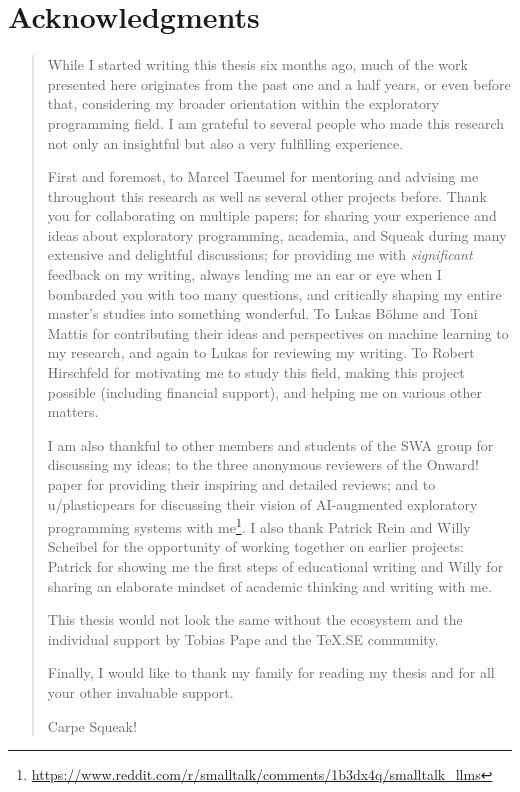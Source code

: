 
\begingroup
\let\raggedsection\centering

\chapter*{Acknowledgments}
\label{cha:acknowledgments}
\endgroup
\begin{quotation}
	\noindent
	\begin{footnotesize}
	While I started writing this thesis six months ago, much of the work presented here originates from the past one and a half years, or even before that, considering my broader orientation within the exploratory programming field.
	I am grateful to several people who made this research not only an insightful but also a very fulfilling experience.

	First and foremost, to Marcel Taeumel for mentoring and advising me throughout this research as well as several other projects before. Thank you for collaborating on multiple papers; for sharing your experience and ideas about exploratory programming, academia, and Squeak during many extensive and delightful discussions; for providing me with \emph{significant} feedback on my writing, always lending me an ear or eye when I bombarded you with too many questions, and critically shaping my entire master's studies into something wonderful.
	To Lukas Böhme and Toni Mattis for contributing their ideas and perspectives on machine learning to my research, and again to Lukas for reviewing my writing.
	To Robert Hirschfeld for motivating me to study this field, making this project possible (including financial support), and helping me on various other matters.

	I am also thankful to other members and students of the SWA group for discussing my ideas; to the three anonymous reviewers of the Onward! paper for providing their inspiring and detailed reviews; and to u/plasticpears for discussing their vision of AI-augmented exploratory programming systems with me\footnote{\url{https://www.reddit.com/r/smalltalk/comments/1b3dx4q/smalltalk_llms}}.
	I also thank Patrick Rein and Willy Scheibel for the opportunity of working together on earlier projects: Patrick for showing me the first steps of educational writing and Willy for sharing an elaborate mindset of academic thinking and writing with me.

	This thesis would not look the same without the ecosystem and the individual support by Tobias Pape and the \TeX.SE community.

	Finally, I would like to thank my family for reading my thesis and for all your other invaluable support.

	\medskip

	Carpe Squeak!
	\end{footnotesize}
\end{quotation}
